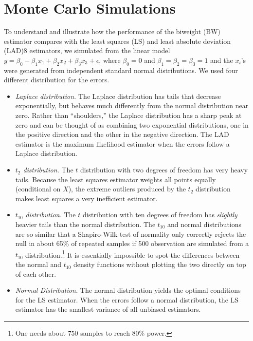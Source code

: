 \documentclass[12pt]{article}
\begin{document}
\section*{Monte Carlo Simulations}

To understand and illustrate how the performance of the biweight (BW) estimator compares with the least squares (LS) and least absolute deviation (LAD)8 estimators, we simulated from the linear model $y = \beta_0 + \beta_1x_1 + \beta_2 x_2 + \beta_3 x_3 + \epsilon$, where $\beta_0 = 0$ and $\beta_1 = \beta_2 = \beta_3 = 1$ and the $x_i$'s were generated from independent standard normal distributions. 
We used four different distribution for the errors.
\begin{itemize}
\item \textit{Laplace distribution.} 
The Laplace distribution has tails that decrease exponentially, but behaves much differently from the normal distribution near zero. 
Rather than ``shoulders,'' the Laplace distribution has a sharp peak at zero and can be thought of as combining two exponential distributions, one in the positive direction and the other in the negative direction.
The LAD estimator is the maximum likelihood estimator when the errors follow a Laplace distribution.
\item \textit{$t_2$ distribution.} 
The $t$ distribution with two degrees of freedom has very heavy tails. 
Because the least squares estimator weights all points equally (conditional on $X$), the extreme outliers produced by the $t_2$ distribution makes least squares a very inefficient estimator.
\item \textit{$t_{10}$ distribution.} 
The $t$ distribution with ten degrees of freedom has \textit{slightly} heavier tails than the normal distribution. 
The $t_{10}$ and normal distributions are so similar that a Shapiro-Wilk test of normality only correctly rejects the null in about 65\% of repeated samples if 500 observation are simulated from a $t_{10}$ distribution.\footnote{One needs about 750 samples to reach 80\% power.} 
It is essentially impossible to spot the differences between the normal and $t_{10}$ density functions without plotting the two directly on top of each other.
\item \textit{Normal Distribution.} The normal distribution yields the optimal conditions for the LS estimator. 
When the errors follow a normal distribution, the LS estimator has the smallest variance of all unbiased estimators. 
\end{itemize}
\end{document}
